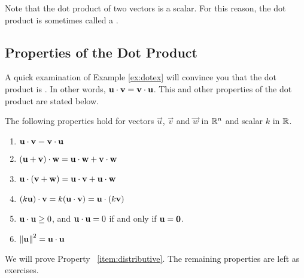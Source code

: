 \documentclass{ximera}
\begin{document}
Note that the dot product of two vectors is a scalar.  For this reason, the dot product is sometimes called a .

\subsection*{Properties of the Dot Product}

A quick examination of Example \ref{ex:dotex} will convince you that the dot product is . In other words, $\vec{u}\dotp\vec{v}=\vec{v}\dotp\vec{u}$.  This and other properties of the dot product are stated below.

\begin{theorem}\label{th:dotproductproperties} The following properties hold for
  vectors $\vec{u}$, $\vec{v}$ and $\vec{w}$ in $\RR^n$ and scalar
  $k$ in $\RR$.
  \begin{enumerate}
  \item\label{item:commutative}
    $\vec{u}\dotp\vec{v}=\vec{v}\dotp\vec{u}$
   
  \item\label{item:distributive} $(\vec{u}+\vec{v})\dotp \vec{w}=\vec{u}\dotp \vec{w}+\vec{v}\dotp \vec{w}$
   
  \item\label{item:distributive-again} $\vec{u}\dotp (\vec{v}+\vec{w})=\vec{u}\dotp\vec{v}+\vec{u}\dotp \vec{w}$
   
  \item\label{item:scalar} $(k\vec{u})\dotp \vec{v}=k(\vec{u}\dotp\vec{v})=\vec{u}\dotp (k\vec{v})$
   
  \item \label{item:positive} $\vec{u}\dotp\vec{u}\geq 0$, and $\vec{u}\dotp\vec{u}=0$ if and only if $\vec{u}={\bf 0}$.
   
  \item \label{item:norm}
    $\norm{\vec{u}}^2=\vec{u}\dotp\vec{u}$
  \end{enumerate}
\end{theorem}

We will prove Property ~\ref{item:distributive}.  The remaining properties are left as exercises.
\end{document}

